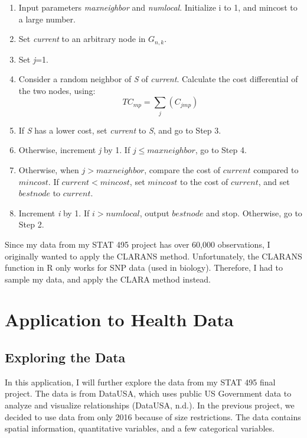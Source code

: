 \documentclass[12pt,twoside]{amherstthesis}
\providecommand{\tightlist}{%
  \setlength{\itemsep}{0pt}\setlength{\parskip}{0pt}}
\begin{document}
  \begin{enumerate}
  \def\labelenumi{\arabic{enumi}.}
  \tightlist
  \item
    Input parameters \emph{maxneighbor} and \emph{numlocal}. Initialize i
    to 1, and mincost to a large number.
  \item
    Set \emph{current} to an arbitrary node in \(G_{n,k}\).
  \item
    Set \emph{j}=1.
  \item
    Consider a random neighbor of \emph{S} of \emph{current}. Calculate
    the cost differential of the two nodes, using:
    \[ TC_{mp} = \sum_j(C_{jmp}) \]
  \item
    If \emph{S} has a lower cost, set \emph{current} to \emph{S}, and go
    to Step 3.
  \item
    Otherwise, increment \emph{j} by 1. If \(j \leq maxneighbor\), go to
    Step 4.
  \item
    Otherwise, when \(j > maxneighbor\), compare the cost of \(current\)
    compared to \(mincost\). If \(current < mincost\), set \(mincost\) to
    the cost of \(current\), and set \(bestnode\) to \(current\).
  \item
    Increment \emph{i} by 1. If \(i > numlocal\), output \(bestnode\) and
    stop. Otherwise, go to Step 2.
  \end{enumerate}
  
  Since my data from my STAT 495 project has over 60,000 observations, I
  originally wanted to apply the CLARANS method. Unfortunately, the
  CLARANS function in R only works for SNP data (used in biology).
  Therefore, I had to sample my data, and apply the CLARA method instead.
  
  \chapter{Application to Health Data}\label{typeset-equ}
  
  \section{Exploring the Data}\label{exploring-the-data}
  
  In this application, I will further explore the data from my STAT 495
  final project. The data is from DataUSA, which uses public US Government
  data to analyze and visualize relationships (DataUSA, n.d.). In the
  previous project, we decided to use data from only 2016 because of size
  restrictions. The data contains spatial information, quantitative
  variables, and a few categorical variables.
  
\end{document}
